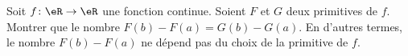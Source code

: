 
\begin{exercice}\label{exoDerive-0007}

    Soit $f\colon \eR\to \eR$ une fonction continue. Soient $F$ et $G$ deux primitives de $f$. Montrer que le nombre $F(b)-F(a)=G(b)-G(a)$. En d'autres termes, le nombre $F(b)-F(a)$ ne dépend pas du choix de la primitive de $f$.

\end{exercice}
